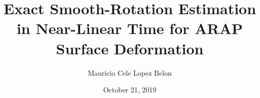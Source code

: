\documentclass{birkjour}
\theoremstyle{remark}
\numberwithin{equation}{section}
\begin{document}
%
%
%
%
%
%
%
%
%


\title[Exact Smooth-Rotation Estimation in Near-Linear Time]
 {Exact Smooth-Rotation Estimation \\in Near-Linear Time for ARAP \\Surface Deformation}

\author[Mauricio Cele Lopez Belon]{Mauricio Cele Lopez Belon}
\address{Madrid, Spain}



\date{October 21, 2019}
\end{document}

